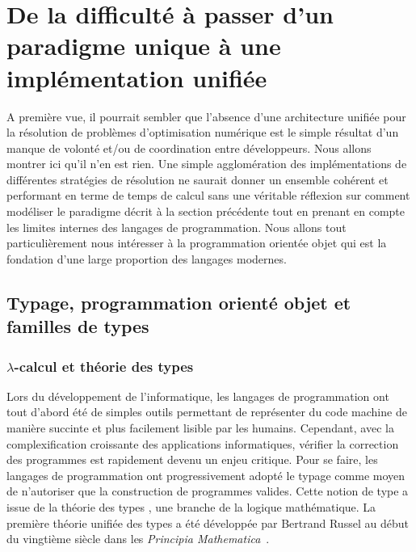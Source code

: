 \section{De la dif\-ficulté à passer d'un paradigme uni\-que à une implémentation unifiée}


A première vue, il pourrait sembler que l'absence d'une architecture
unifiée pour la résolution de problèmes d'optimisation numérique est
le simple résultat d'un manque de volonté et/ou de coordination entre
développeurs. Nous allons montrer ici qu'il n'en est rien. Une simple
agglomération des implémentations de différentes stratégies de
résolution ne saurait donner un ensemble cohérent et performant en
terme de temps de calcul sans une véritable réflexion sur comment
modéliser le paradigme décrit à la section précédente tout en prenant
en compte les limites internes des langages de programmation. Nous
allons tout particulièrement nous intéresser à la programmation
orientée objet qui est la fondation d'une large proportion des
langages modernes.


\subsection{Typage, programmation orienté objet et familles de types}

\subsubsection{$\lambda$-calcul et théorie des types}

Lors du développement de l'informatique, les langages de programmation
ont tout d'abord été de simples outils permettant de représenter du
code machine de manière succinte et plus facilement lisible par les
humains. Cependant, avec la complexification croissante des
applications informatiques, vérifier la correction des programmes est
rapidement devenu un enjeu critique. Pour se faire, les langages de
programmation ont progressivement adopté le typage comme moyen de
n'autoriser que la construction de programmes valides. Cette notion de
type a issue de la théorie des types , une
branche de la logique mathématique. La première théorie unifiée des
types a été développée par Bertrand Russel  au
début du vingtième siècle dans les \emph{Principia
  Mathematica}~\citep{pm}.


